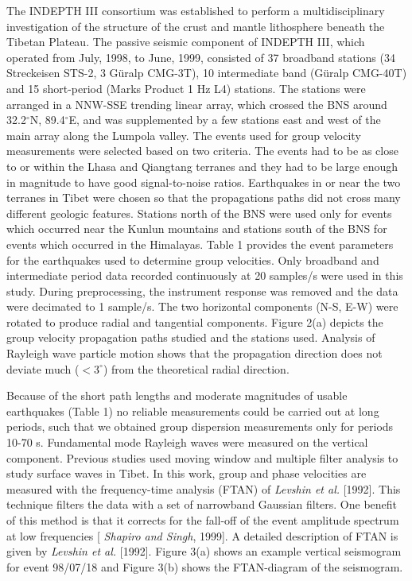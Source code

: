 \documentclass[12pt]{article}
\begin{document}
The INDEPTH III consortium was established to perform a multidisciplinary investigation of the structure of
the crust and mantle lithosphere beneath the Tibetan Plateau.  The passive seismic component of INDEPTH III,
which operated from July, 1998, to June, 1999, consisted of 37 broadband
stations (34 Streckeisen STS-2, 3 G\"uralp
CMG-3T), 10 intermediate band (G\"uralp CMG-40T) and 15 short-period (Marks Product 1 Hz L4) stations.  The
stations were arranged in a NNW-SSE trending linear array, which crossed the BNS around 32.2$^\circ$N,
89.4$^\circ$E, and was supplemented by a few stations east and west of the main array along the Lumpola
valley.  The events used for group velocity measurements were selected based on two criteria.  The events had to be as close
to or within the Lhasa and Qiangtang terranes and they had to be large enough in magnitude to have good
signal-to-noise ratios. Earthquakes in or near the two terranes in Tibet were chosen so that the
propagations paths did not cross many different geologic features. Stations north of the BNS were used only
for events which occurred near the Kunlun mountains and stations south of the BNS for events which occurred
in the Himalayas.   Table 1 provides the event parameters for the earthquakes used to determine group
velocities.  Only broadband and intermediate period data recorded continuously at 20 samples/s were used in
this study.  During preprocessing, the instrument response was removed and the data were decimated to 1
sample/s.  The two horizontal components (N-S, E-W) were rotated to produce radial and tangential
components.  Figure 2(a) depicts the group velocity propagation paths studied and the stations used.
Analysis of Rayleigh wave particle motion shows that the propagation direction does not deviate much
($<3^\circ$) from the theoretical radial direction.

Because of the short path lengths and moderate magnitudes of usable earthquakes (Table 1) no reliable
measurements could be carried out at long periods, such that we obtained group dispersion measurements
only for periods 10-70 s.  Fundamental mode Rayleigh waves were measured on the vertical component. Previous
studies used moving window and multiple filter analysis to study surface waves in Tibet.  In this work,
group and phase velocities are measured with the frequency-time analysis (FTAN) of {\it Levshin et al.}
[1992].  This technique filters the data with a set of narrowband Gaussian filters.  One benefit of this
method is that it corrects for the fall-off of the event amplitude spectrum at low frequencies [{\it
Shapiro and Singh}, 1999].  A detailed description of FTAN is given by {\it Levshin et al.} [1992].  Figure
3(a) shows an example vertical seismogram for event 98/07/18 and Figure 3(b) shows the FTAN-diagram of the
seismogram.
\end{document}
